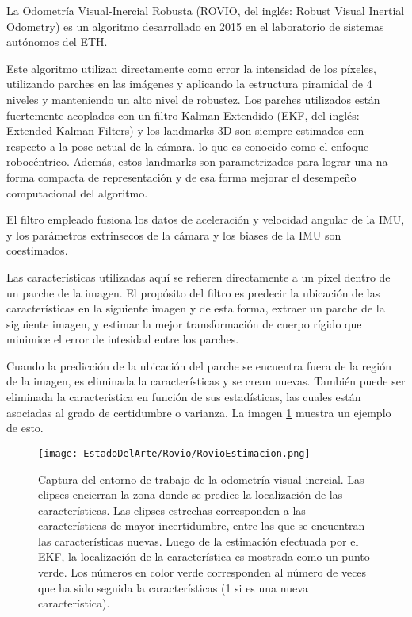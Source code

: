 La Odometría Visual-Inercial Robusta (ROVIO, del inglés: Robust Visual Inertial Odometry) es un algoritmo desarrollado en 2015 en el laboratorio de sistemas autónomos del ETH.

Este algoritmo utilizan directamente como error la intensidad de los píxeles, utilizando parches en las  imágenes y aplicando la estructura piramidal de 4 niveles y manteniendo un alto nivel de robustez. Los parches utilizados están fuertemente acoplados con un filtro Kalman Extendido (EKF, del inglés: Extended Kalman Filters) y los landmarks 3D son siempre estimados con respecto a la pose actual de la cámara. lo que es conocido como el enfoque robocéntrico. Además, estos landmarks son parametrizados para lograr una na forma compacta de representación y de esa forma mejorar el desempeño computacional del algoritmo. 

El filtro empleado fusiona los datos de aceleración y velocidad angular de la IMU, y los parámetros extrinsecos de la cámara y los biases de la IMU son coestimados. 

Las características utilizadas aquí se refieren directamente a un píxel dentro de un parche de la imagen. El propósito del filtro es predecir la ubicación de las características en la siguiente imagen y de esta forma, extraer un parche de la siguiente imagen, y estimar la mejor transformación de cuerpo rígido que minimice el error de intesidad entre los parches. 

Cuando la predicción de la ubicación del parche se encuentra fuera de la región de la imagen, es eliminada la características y se crean nuevas. También puede ser eliminada la caracteristica en función de sus estadísticas, las cuales están asociadas al grado de certidumbre o varianza. La imagen \ref{fig:RovioEstimacion} muestra un ejemplo de esto.

\begin{figure}[H]
	\centering
	\texttt{[image: EstadoDelArte/Rovio/RovioEstimacion.png]}
	\caption{Captura del entorno de trabajo de la odometría visual-inercial. Las elipses encierran la zona donde se predice la localización de las características. Las elipses estrechas corresponden a las características de mayor incertidumbre, entre las que se encuentran las características nuevas. Luego de la estimación efectuada por el EKF, la localización de la característica es mostrada como un punto verde. Los números en color verde corresponden al número de veces que ha sido seguida la características (1 si es una nueva característica).}
	\label{fig:RovioEstimacion}
\end{figure}


